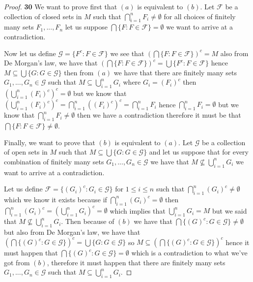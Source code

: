 \documentclass[11pt]{article}
\theoremstyle{definition}
\begin{document}
    \begin{proof}{\textbf{30}}
        We want to prove first that $(a)$ is equivalent to $(b)$.
        Let $\mathcal{F}$ be a collection of closed sets in $M$ such that
        $\bigcap_{i=1}^n F_i \neq \emptyset$ for all choices of finitely many
        sets $F_1, ..., F_n$ let us suppose
        $\bigcap \{F: F \in \mathcal{F}\} = \emptyset$ we want to arrive at
        a contradiction.

        Now let us define $\mathcal{G} = \{F^c: F \in \mathcal{F}\}$ we see
        that $(\bigcap\{F: F \in \mathcal{F}\})^c = M$
        also from De Morgan's law, we have that
        $(\bigcap\{F: F \in \mathcal{F}\})^c = \bigcup\{F^c: F \in \mathcal{F}\}$
        hence $M \subseteq \bigcup\{G: G \in \mathcal{G}\}$ then from $(a)$ we
        have that there are finitely many sets $G_1, ..., G_n \in \mathcal{G}$
        such that $M \subseteq \bigcup_{i=1}^n G_i$ where $G_i = (F_i)^c$ then
        $(\bigcup_{i=1}^n (F_i)^c)^c = \emptyset$ but we know that
        $(\bigcup_{i=1}^n (F_i)^c)^c = \bigcap_{i=1}^n ((F_i)^c)^c
        = \bigcap_{i=1}^n F_i$ hence $\bigcap_{i=1}^n F_i = \emptyset$ but we
        know that $\bigcap_{i=1}^n F_i \neq \emptyset$ then we have a
        contradiction therefore it must be that
        $\bigcap \{F: F \in \mathcal{F}\} \neq \emptyset$.

        Finally, we want to prove that $(b)$ is equivalent to $(a)$.
        Let $\mathcal{G}$ be a collection of open sets in $M$ such that
        $M \subseteq \bigcup\{G: G \in \mathcal{G}\}$ and let us suppose that
        for every combination of finitely many sets
        $G_1, ..., G_n \in \mathcal{G}$ we have that 
        $M \not\subseteq \bigcup_{i=1}^n G_i$ we want to arrive at a
        contradiction.
        
        Let us define $\mathcal{F} = \{(G_i)^c: G_i \in \mathcal{G}\}$ for
        $1 \leq i \leq n$ such that $\bigcap_{i=1}^n (G_i)^c \neq \emptyset$
        which we know it exists because if $\bigcap_{i=1}^n (G_i)^c = \emptyset$
        then $\bigcap_{i=1}^n (G_i)^c = (\bigcup_{i=1}^n G_i)^c = \emptyset$
        which implies that $\bigcup_{i=1}^n G_i = M$ but we said that
        $M \not\subseteq \bigcup_{i=1}^n G_i$.
        Then because of $(b)$ we have that
        $\bigcap\{(G)^c: G \in \mathcal{G}\} \neq \emptyset$
        but also from De Morgan's law, we have that
        $(\bigcap\{(G)^c: G \in \mathcal{G}\})^c = \bigcup\{G: G \in \mathcal{G}\}$
        so $M \subseteq (\bigcap\{(G)^c: G \in \mathcal{G}\})^c$ hence it must happen
        that $\bigcap\{(G)^c: G \in \mathcal{G}\} = \emptyset$ which is a
        contradiction to what we've got from $(b)$, therefore it must happen
        that there are finitely  many sets
        $G_1, ..., G_n \in \mathcal{G}$ such that
        $M \subseteq \bigcup_{i=1}^n G_i$.
    \end{proof}
\end{document}
